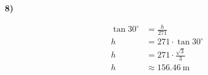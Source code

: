 \documentclass[11pt,a4paper,fleqn]{article}
\begin{document}
\textbf{8)}

\begin{align*}
  \tan 30^{\circ} &= \frac{h}{271} \\[6pt]
  h &= 271 \cdot \tan 30^{\circ} \\[6pt]
  h &= 271 \cdot \frac{\sqrt{3}}{3} \\[6pt]
  h &\approx 156.46\ \text{m}
\end{align*}
\end{document}
